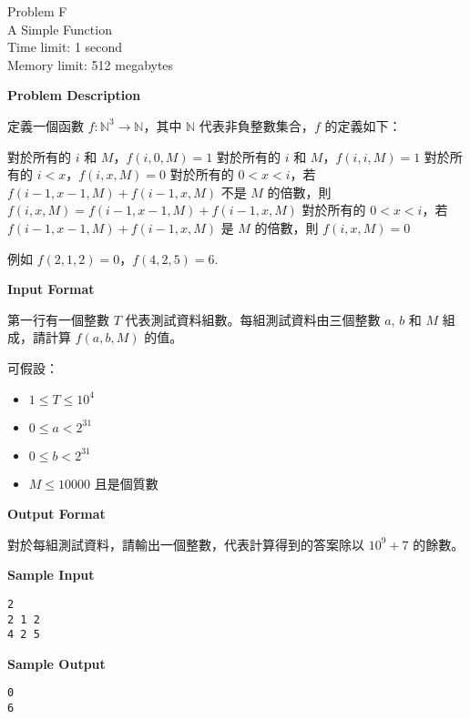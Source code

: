 \begin{center}
    {\LARGE Problem F}\vspace{1mm}\\
    {\Large A Simple Function}\\
    {Time limit: 1 second}\\
    {Memory limit: 512 megabytes}
\end{center}

\textbf{\large Problem Description}

定義一個函數 $f:\mathbb{N}^{3} \to \mathbb{N}$，其中 $\mathbb{N}$ 代表非負整數集合，$f$ 的定義如下：

\begin{outline}
	\1 對於所有的 $i$ 和 $M$，$f(i, 0, M)=1$
	\1 對於所有的 $i$ 和 $M$，$f(i, i, M)=1$
	\1 對於所有的 $i < x$，$f(i, x, M)=0$
	\1 對於所有的 $0 < x < i$，若 $f(i-1, x-1, M)+f(i-1, x, M)$ 不是 $M$ 的倍數，則 $f(i, x, M)=f(i-1, x-1, M)+f(i-1, x, M)$
	\1 對於所有的 $0 < x < i$，若 $f(i-1, x-1, M)+f(i-1, x, M)$ 是 $M$ 的倍數，則 $f(i, x, M)=0$
\end{outline}

例如 $f(2, 1, 2) = 0$，$f(4, 2, 5) = 6$.

\textbf{\large Input Format}

第一行有一個整數 $T$ 代表測試資料組數。每組測試資料由三個整數 $a$, $b$ 和 $M$ 
組成，請計算 $f(a, b, M)$ 的值。

可假設：
\begin{itemize}
    \tightlist{}
    \item $1 \le T \le 10^4$
    \item $0 \leq a < 2^{31}$
    \item $0 \leq b < 2^{31}$
    \item $M \leq 10000$ 且是個質數
\end{itemize}

\textbf{\large Output Format}

對於每組測試資料，請輸出一個整數，代表計算得到的答案除以 $10^{9}+7$ 的餘數。

\textbf{\large Sample Input}

\begin{verbatim}
2
2 1 2
4 2 5
\end{verbatim}

\textbf{\large Sample Output}

\begin{verbatim}
0
6
\end{verbatim}

